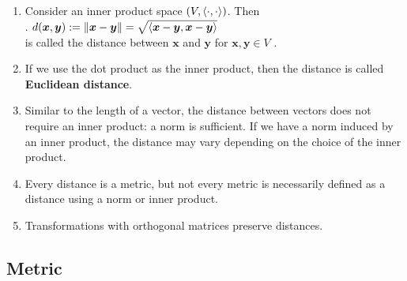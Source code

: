 \begin{enumerate}
    \item Consider an inner product space $(V,\langle\cdot, \cdot\rangle)$. 
    Then
    \hfill \cite{mfml/book/mml/Deisenroth-Faisal-Ong}
    \\
    .\hfill
    $
        d(\bm{x}, \bm{y})
        := \left\| \bm{x} - \bm{y} \right\|
        = \sqrt{\langle\bm{x} - \bm{y}, \bm{x} - \bm{y}\rangle}
    $
    \hfill \cite{mfml/book/mml/Deisenroth-Faisal-Ong}
    \\
    is called the distance between $\bm{x}$ and $\bm{y}$ for $\bm{x}, \bm{y} \in V$ .
    \hfill \cite{mfml/book/mml/Deisenroth-Faisal-Ong}

    \item If we use the dot product as the inner product, then the distance is called \textbf{Euclidean distance}.
    \hfill \cite{mfml/book/mml/Deisenroth-Faisal-Ong}

    \item Similar to the length of a vector, the distance between vectors does not require an inner product: a norm is sufficient.
    If we have a norm induced by an inner product, the distance may vary depending on the choice of the inner product. 
    \hfill \cite{mfml/book/mml/Deisenroth-Faisal-Ong}

    \item Every distance is a metric, but not every metric is necessarily defined as a distance using a norm or inner product.
    \hfill \cite{common/online/chatgpt}

    \item Transformations with orthogonal matrices preserve distances.
    \hfill \cite{mfml/book/mml/Deisenroth-Faisal-Ong}
\end{enumerate}




\subsection{Metric}

